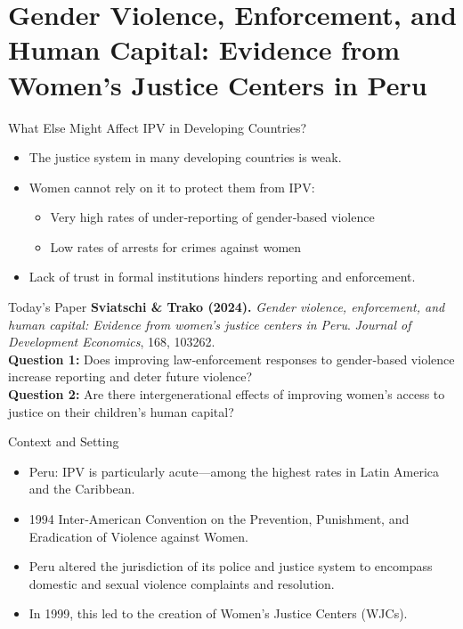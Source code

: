 \documentclass[11pt,notes=hide,aspectratio=169,mathserif]{beamer}
\begin{document}
\section{Gender Violence, Enforcement, and Human Capital: Evidence from Women’s Justice Centers in Peru}

\begin{frame}{What Else Might Affect IPV in Developing Countries?}
\begin{itemize}
  \item The justice system in many developing countries is weak.
  \item Women cannot rely on it to protect them from IPV:
  \begin{itemize}
    \item Very high rates of under‑reporting of gender‑based violence
    \item Low rates of arrests for crimes against women
  \end{itemize}
  \item Lack of trust in formal institutions hinders reporting and enforcement.
\end{itemize}
\end{frame}

\begin{frame}{Today's Paper}
\small
\textbf{Sviatschi \& Trako (2024).} \emph{Gender violence, enforcement, and human capital: Evidence from women’s justice centers in Peru}. \textit{Journal of Development Economics}, 168, 103262.\\[0.6em]
\textbf{Question 1:} Does improving law‑enforcement responses to gender‑based violence increase reporting and deter future violence? \\[0.6em]
\textbf{Question 2:} Are there intergenerational effects of improving women’s access to justice on their children’s human capital?
\end{frame}

\begin{frame}{Context and Setting}
\begin{itemize}
  \item Peru: IPV is particularly acute—among the highest rates in Latin America and the Caribbean.
  \item 1994 Inter‑American Convention on the Prevention, Punishment, and Eradication of Violence against Women.
  \item Peru altered the jurisdiction of its police and justice system to encompass domestic and sexual violence complaints and resolution.
  \item In 1999, this led to the creation of Women’s Justice Centers (WJCs).
\end{itemize}
\end{frame}
\end{document}
